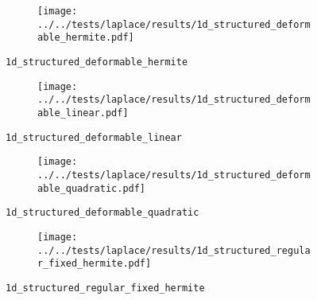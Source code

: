 \begin{frame}{}
  \vspace*{-0.2cm}
  \begin{figure}[h!]
    \begin{subfigure}[t]{0.48\textwidth}%
      \centering%
      \texttt{[image: ../../tests/laplace/results/1d\_structured\_deformable\_hermite.pdf]}%
    \end{subfigure}%
    \caption{\lstinline{1d_structured_deformable_hermite}}
  \end{figure} 
\end{frame}
%
%
\begin{frame}{}
  \vspace*{-0.2cm}
  \begin{figure}[h!]
    \begin{subfigure}[t]{0.48\textwidth}%
      \centering%
      \texttt{[image: ../../tests/laplace/results/1d\_structured\_deformable\_linear.pdf]}%
    \end{subfigure}%
    \caption{\lstinline{1d_structured_deformable_linear}}
  \end{figure} 
\end{frame}
%
%
\begin{frame}{}
  \vspace*{-0.2cm}
  \begin{figure}[h!]
    \begin{subfigure}[t]{0.48\textwidth}%
      \centering%
      \texttt{[image: ../../tests/laplace/results/1d\_structured\_deformable\_quadratic.pdf]}%
    \end{subfigure}%
    \caption{\lstinline{1d_structured_deformable_quadratic}}
  \end{figure} 
\end{frame}
%
%
\begin{frame}{}
  \vspace*{-0.2cm}
  \begin{figure}[h!]
    \begin{subfigure}[t]{0.48\textwidth}%
      \centering%
      \texttt{[image: ../../tests/laplace/results/1d\_structured\_regular\_fixed\_hermite.pdf]}%
    \end{subfigure}%
    \caption{\lstinline{1d_structured_regular_fixed_hermite}}
  \end{figure} 
\end{frame}
